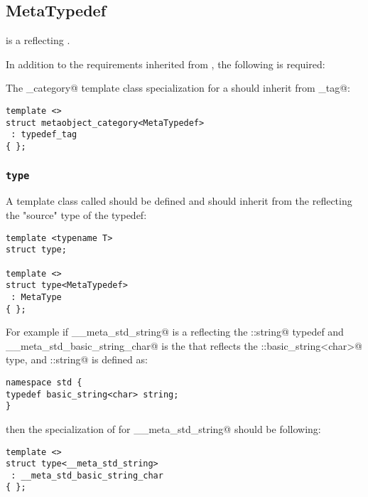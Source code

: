 \subsection{MetaTypedef}
\label{concept-MetaTypedef}


 is a  reflecting \verb@typedef@s.

In addition to the requirements inherited from , the following is required:

The \verb@metaobject_category@ template class specialization for a  should
inherit from \verb@typedef_tag@:

\begin{verbatim}
template <>
struct metaobject_category<MetaTypedef>
 : typedef_tag
{ };
\end{verbatim}

\subsubsection{\texttt{type}}

A template class called \verb@type@ should be defined and should inherit from the 
reflecting the "source" type of the typedef:

\begin{verbatim}
template <typename T>
struct type;

template <>
struct type<MetaTypedef>
 : MetaType
{ };
\end{verbatim}

For example if \verb@__meta_std_string@ is a  reflecting the \verb@std::string@
typedef and \verb@__meta_std_basic_string_char@ is the  that reflects
the \verb@std::basic_string<char>@ type, and \verb@std::string@ is defined as:

\begin{verbatim}
namespace std {
typedef basic_string<char> string;
}
\end{verbatim}

then the specialization of \verb@type@ for \verb@__meta_std_string@ should be following:

\begin{verbatim}
template <>
struct type<__meta_std_string>
 : __meta_std_basic_string_char
{ };
\end{verbatim}

